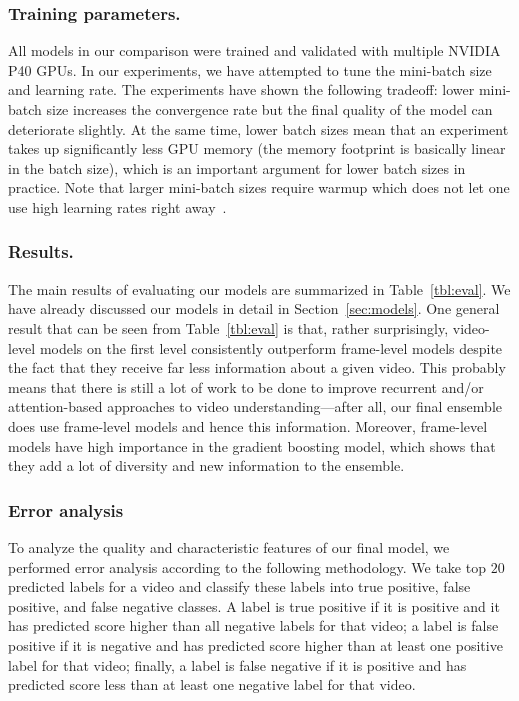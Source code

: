 \documentclass[runningheads]{llncs}
\begin{document}
\subsubsection*{Training parameters.}
All models in our comparison were trained and validated with multiple NVIDIA P40 GPUs. In our experiments, we have attempted to tune the mini-batch size and learning rate. The experiments have shown the following tradeoff: lower mini-batch size increases the convergence rate but the final quality of the model can deteriorate slightly. At the same time, lower batch sizes mean that an experiment takes up significantly less GPU memory (the memory footprint is basically linear in the batch size), which is an important argument for lower batch sizes in practice. Note that larger mini-batch sizes require warmup which does not let one use high learning rates right away~\cite{DBLP:journals/corr/GoyalDGNWKTJH17}.

\subsubsection*{Results.}
The main results of evaluating our models are summarized in Table~\ref{tbl:eval}. We have already discussed our models in detail in Section~\ref{sec:models}. One general result that can be seen from Table~\ref{tbl:eval} is that, rather surprisingly, video-level models on the first level consistently outperform frame-level models despite the fact that they receive far less information about a given video. This probably means that there is still a lot of work to be done to improve recurrent and/or attention-based approaches to video understanding---after all, our final ensemble does use frame-level models and hence this information. Moreover, frame-level models have high importance in the gradient boosting model, which shows that they add a lot of diversity and new information to the ensemble.

\subsubsection*{Error analysis}
To analyze the quality and characteristic features of our final model, we performed error analysis according to the following methodology. We take top $20$ predicted labels for a video and classify these labels into true positive, false positive, and false negative classes. A label is true positive if it is positive and it has predicted score higher than all negative labels for that video; a label is false positive if it is negative and has predicted score higher than at least one positive label for that video; finally, a label is false negative if it is positive and has predicted score less than at least one negative label for that video.
\end{document}
